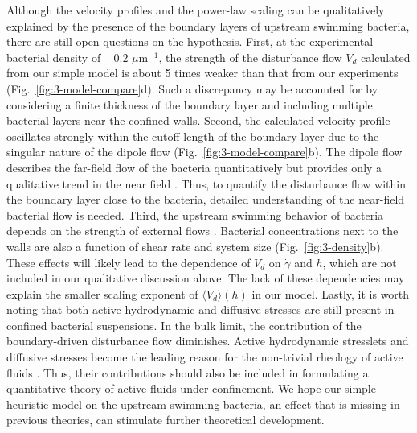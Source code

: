 Although the velocity profiles and the power-law scaling can be qualitatively explained by the presence of the boundary layers of upstream swimming bacteria, there are still open questions on the hypothesis. First, at the experimental bacterial density of ~ 0.2 $\mu$m$^{-1}$, the strength of the disturbance flow $V_d$ calculated from our simple model is about 5 times weaker than that from our experiments (Fig.~\ref{fig:3-model-compare}d). Such a discrepancy may be accounted for by considering a finite thickness of the boundary layer and including multiple bacterial layers near the confined walls. Second, the calculated velocity profile oscillates strongly within the cutoff length of the boundary layer due to the singular nature of the dipole flow (Fig.~\ref{fig:3-model-compare}b). The dipole flow describes the far-field flow of the bacteria quantitatively but provides only a qualitative trend in the near field \cite{Drescher2011, Mathijssen2016}. Thus, to quantify the disturbance flow within the boundary layer close to the bacteria, detailed  understanding of the near-field bacterial flow is needed. Third, the upstream swimming behavior of bacteria depends on the strength of external flows \cite{Kaya2012}.
Bacterial concentrations next to the walls are also a function of shear rate and system size (Fig.~\ref{fig:3-density}b). These effects will likely lead to the dependence of $V_d$ on $\dot\gamma$ and $h$, which are not included in our qualitative discussion above. The lack of these dependencies may explain the smaller scaling exponent of $\langle V_d \rangle(h)$ in our model. Lastly, it is worth noting that both active hydrodynamic and diffusive stresses are still present in confined bacterial suspensions. In the bulk limit, the contribution of the boundary-driven disturbance flow diminishes. Active hydrodynamic stresslets and diffusive stresses
become the leading reason for the non-trivial rheology of active fluids \cite{Alonso-Matilla2016, Takatori2017}. Thus, their contributions should also be included in formulating a quantitative theory of active fluids under confinement. We hope our simple heuristic model on the upstream swimming bacteria, an effect that is missing in previous theories, can stimulate further theoretical development.


